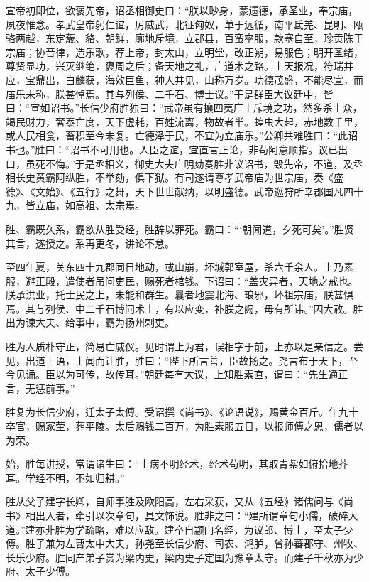 \documentclass[]{article}
\begin{document}
宣帝初即位，欲褒先帝，诏丞相御史曰：``朕以眇身，蒙遗德，承圣业，奉宗庙，夙夜惟念。孝武皇帝躬仁谊，厉威武，北征匈奴，单于远循，南平氐羌、昆明、瓯骆两越，东定薉、貉、朝鲜，廓地斥境，立郡县，百蛮率服，款塞自至，珍贡陈于宗庙；协音律，造乐歌，荐上帝，封太山，立明堂，改正朔，易服色；明开圣绪，尊贤显功，兴灭继绝，褒周之后；备天地之礼，广道术之路。上天报况，符瑞并应，宝鼎出，白麟获，海效巨鱼，神人并见，山称万岁。功德茂盛，不能尽宣，而庙乐未称，朕甚悼焉。其与列侯、二千石、博士议。''于是群臣大议廷中，皆曰：``宣如诏书。''长信少府胜独曰：``武帝虽有攘四夷广土斥境之功，然多杀士众，竭民财力，奢泰亡度，天下虚耗，百姓流离，物故者半。蝗虫大起，赤地数千里，或人民相食，畜积至今未复。亡德泽于民，不宜为立庙乐。''公卿共难胜曰：``此诏书也。''胜曰：``诏书不可用也。人臣之谊，宜直言正论，非苟阿意顺指。议已出口，虽死不悔。''于是丞相义，御史大夫广明劾奏胜非议诏书，毁先帝，不道，及丞相长史黄霸阿纵胜，不举劾，俱下狱。有司遂请尊孝武帝庙为世宗庙，奏《盛德》、《文始》、《五行》之舞，天下世世献纳，以明盛德。武帝巡狩所幸郡国凡四十九，皆立庙，如高祖、太宗焉。

胜、霸既久系，霸欲从胜受经，胜辞以罪死。霸曰：```朝闻道，夕死可矣'。''胜贤其言，遂授之。系再更冬，讲论不怠。

至四年夏，关东四十九郡同日地动，或山崩，坏城郭室屋，杀六千余人。上乃素服，避正殿，遣使者吊问吏民，赐死者棺钱。下诏曰：``盖灾异者，天地之戒也。朕承洪业，托士民之上，未能和群生。曩者地震北海、琅邪，坏祖宗庙，朕甚惧焉。其与列侯、中二千石博问术士，有以应变，补朕之阙，毋有所讳。''因大赦。胜出为谏大夫、给事中，霸为扬州剌吏。

胜为人质朴守正，简易亡威仪。见时谓上为君，误相字于前，上亦以是亲信之。尝见，出道上语，上闻而让胜，胜曰：``陛下所言善，臣故扬之。尧言布于天下，至今见诵。臣以为可传，故传耳。''朝廷每有大议，上知胜素直，谓曰：``先生通正言，无惩前事。''

胜复为长信少府，迁太子太傅。受诏撰《尚书》、《论语说》，赐黄金百斤。年九十卒官，赐冢茔，葬平陵。太后赐钱二百万，为胜素服五日，以报师傅之恩，儒者以为荣。

始，胜每讲授，常谓诸生曰：``士病不明经术，经术苟明，其取青紫如俯拾地芥耳。学经不明，不如归耕。''

胜从父子建字长卿，自师事胜及欧阳高，左右采获，又从《五经》诸儒问与《尚书》相出入者，牵引以次章句，具文饰说。胜非之曰：``建所谓章句小儒，破碎大道。''建亦非胜为学疏略，难以应敌。建卒自颛门名经，为议郎、博士，至太子少傅。胜子兼为左曹太中大夫，孙尧至长信少府、司农、鸿胪，曾孙蕃郡守、州牧、长乐少府。胜同产弟子赏为梁内史，梁内史子定国为豫章太守。而建子千秋亦为少府、太子少傅。
\end{document}
